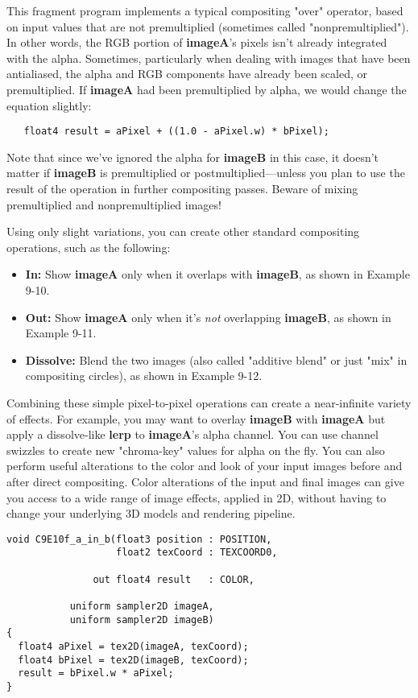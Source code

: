 \documentclass[../main.tex]{subfiles}
\begin{document}
This fragment program implements a typical compositing "over" operator, based on input values that are not premultiplied (sometimes called "nonpremultiplied"). In other words, the RGB portion of \textbf{imageA}'s pixels isn't already integrated with the alpha. Sometimes, particularly when dealing with images that have been antialiased, the alpha and RGB components have already been scaled, or premultiplied. If \textbf{imageA} had been premultiplied by alpha, we would change the equation slightly:

\FloatBarrier
\begin{lstlisting}
   float4 result = aPixel + ((1.0 - aPixel.w) * bPixel);
\end{lstlisting}
\FloatBarrier

Note that since we've ignored the alpha for \textbf{imageB} in this case, it doesn't matter if \textbf{imageB} is premultiplied or postmultiplied—unless you plan to use the result of the operation in further compositing passes. Beware of mixing premultiplied and nonpremultiplied images!

Using only slight variations, you can create other standard compositing operations, such as the following:

\begin{itemize}
\item \textbf{In:} Show \textbf{imageA} only when it overlaps with \textbf{imageB}, as shown in Example 9-10.
\item \textbf{Out:} Show \textbf{imageA} only when it's \textit{not} overlapping \textbf{imageB}, as shown in Example 9-11.
\item \textbf{Dissolve:} Blend the two images (also called "additive blend" or just "mix" in compositing circles), as shown in Example 9-12.
\end{itemize}

Combining these simple pixel-to-pixel operations can create a near-infinite variety of effects. For example, you may want to overlay \textbf{imageB} with \textbf{imageA} but apply a dissolve-like \textbf{lerp} to \textbf{imageA}'s alpha channel. You can use channel swizzles to create new "chroma-key" values for alpha on the fly. You can also perform useful alterations to the color and look of your input images before and after direct compositing. Color alterations of the input and final images can give you access to a wide range of image effects, applied in 2D, without having to change your underlying 3D models and rendering pipeline.

\begin{lstlisting}[caption=Example 9-10. The \textbf{C9E10f_a_in_b} Fragment Program]
void C9E10f_a_in_b(float3 position : POSITION,
                   float2 texCoord : TEXCOORD0,

               out float4 result   : COLOR,

           uniform sampler2D imageA,
           uniform sampler2D imageB)
{
  float4 aPixel = tex2D(imageA, texCoord);
  float4 bPixel = tex2D(imageB, texCoord);
  result = bPixel.w * aPixel;
}
\end{lstlisting}
\end{document}
